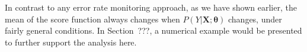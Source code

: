 \documentclass[twoside,11pt]{article}
\begin{document}
In contrast to any error rate monitoring approach, as we have shown earlier, the mean of the score function always changes when $P(Y|\bm{X};\bm{\theta})$ changes, under fairly general conditions. In Section~???, a numerical example would be presented to further support the analysis here.





 
\end{document}
